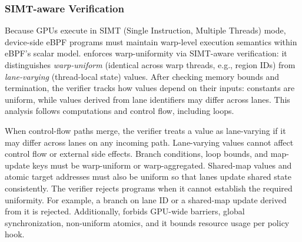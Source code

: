 \subsubsection{SIMT-aware Verification}

Because GPUs execute in SIMT (Single Instruction, Multiple Threads) mode, device-side eBPF programs must maintain warp-level execution semantics within eBPF’s scalar model.
\sys{} enforces warp-uniformity via SIMT-aware verification: it distinguishes \emph{warp-uniform} (identical across warp threads, e.g., region IDs) from \emph{lane-varying} (thread-local state) values.
After checking memory bounds and termination, the verifier tracks how values depend on their inputs: constants are uniform, while values derived from lane identifiers may differ across lanes.
This analysis follows computations and control flow, including loops.

When control-flow paths merge, the verifier treats a value as lane-varying if it may differ across lanes on any incoming path.
Lane-varying values cannot affect control flow or external side effects.
Branch conditions, loop bounds, and map-update keys must be warp-uniform or warp-aggregated.
Shared-map values and atomic target addresses must also be uniform so that lanes update shared state consistently.
The verifier rejects programs when it cannot establish the required uniformity.
For example, a branch on lane ID or a shared-map update derived from it is rejected.
Additionally, \sys{} forbids GPU-wide barriers, global synchronization, non-uniform atomics, and it bounds resource usage per policy hook.

